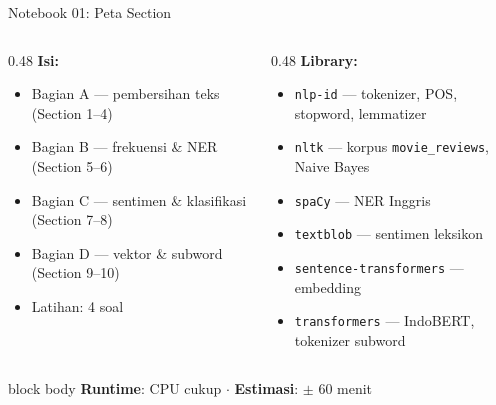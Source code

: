 \documentclass[aspectratio=169,t]{beamer}
\begin{document}
\begin{frame}{Notebook 01: Peta Section}
  \begin{columns}[T]
    \begin{column}{0.48\textwidth}
      \textcolor{nvgreen}{\textbf{Isi:}}
      \begin{itemize}
        \footnotesize
        \item Bagian A --- pembersihan teks (Section 1--4)
        \item Bagian B --- frekuensi \& NER (Section 5--6)
        \item Bagian C --- sentimen \& klasifikasi (Section 7--8)
        \item Bagian D --- vektor \& subword (Section 9--10)
        \item Latihan: 4 soal
      \end{itemize}
    \end{column}
    \begin{column}{0.48\textwidth}
      \textcolor{nvlightgreen}{\textbf{Library:}}
      \begin{itemize}
        \footnotesize
        \item \texttt{nlp-id} --- tokenizer, POS, stopword, lemmatizer
        \item \texttt{nltk} --- korpus \texttt{movie\_reviews}, Naive Bayes
        \item \texttt{spaCy} --- NER Inggris
        \item \texttt{textblob} --- sentimen leksikon
        \item \texttt{sentence-transformers} --- embedding
        \item \texttt{transformers} --- IndoBERT, tokenizer subword
      \end{itemize}
    \end{column}
  \end{columns}
  \vspace{0.5em}
  \begin{beamercolorbox}[rounded=true,shadow=false,sep=4pt]{block body}
    \small\color{white}
    \textbf{Runtime}: CPU cukup \quad $\cdot$ \quad \textbf{Estimasi}: $\pm$ 60 menit
  \end{beamercolorbox}
\end{frame}
\end{document}
